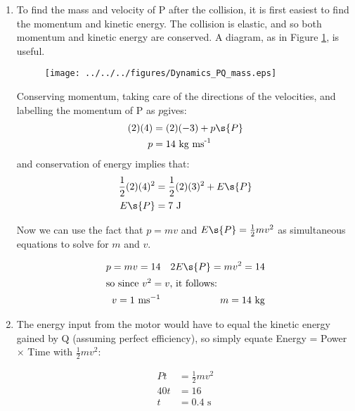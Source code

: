 \begin{problem}[AO1984PIQ1a]
{\begin{enumerate}
In order to work out the maximum tension; we need to relate the tension in the elastic to the extension: the force required to stretch the elastic is  where  is commonly called the spring constant, and so the tension, which is equal in magnitude but opposite in sign, must be . The constant $k$ can be found by considering the energy stored $E = \frac{1}{2}kx^{2}$ and we know both $E$ and $x$:
\begin{equation*} k = \frac{E}{x^{2}} = \frac{16}{(0.5)^{2}} \textrm{ N m}^{-1} = 128 \textrm{ N m}^{-1} \end{equation*}
and so the tension, which is maximum at the maximum extension, is:
\begin{equation*} T\s{max} = kx = (128)(0.5) \textrm{ N} = 64 \textrm{ N} \end{equation*}
	\item To find the mass and velocity of P after the collision, it is first easiest to find the momentum and kinetic energy. The collision is elastic, and so both momentum and kinetic energy are conserved. A diagram, as in Figure \ref{fig:Dynamics_PQ_mass}, is useful.
	
\begin{figure}[h]
	\centering
	\texttt{[image: ../../../figures/Dynamics\_PQ\_mass.eps]}
	\caption{}\label{fig:Dynamics_PQ_mass}
\end{figure}

Conserving momentum, taking care of the directions of the velocities, and labelling the momentum of P as $p$gives:
\begin{align*} 
(2)(4) &= (2)(-3) + p\s{P}  \\ 
p &= 14 \text{ kg ms}^{\text{-1}}
\end{align*}
and conservation of energy implies that:
\begin{align*} 
\frac{1}{2}(2)(4)^{2} &= \frac{1}{2}(2)(3)^{2} + E\s{P}  \\
 E\s{P} &= 7 \text{ J} 
 \end{align*}

Now we can use the fact that $p = mv$ and $E\s{P} = \frac{1}{2}mv^{2}$ as simultaneous equations to solve for $m$ and $v$.

\begin{align*} 
p = mv = 14 &&  2E\s{P} = mv^{2} = 14 \\ 
\intertext{so since $v^{2} = v$, it follows:} v = 1 \text{ ms}^{-1} && m = 14 \text{ kg} 
\end{align*}

	\item The energy input from the motor would have to equal the kinetic energy gained by Q (assuming perfect efficiency), so simply equate Energy = Power $\times$ Time with $\frac{1}{2}mv^{2}$:

\begin{align*} 
Pt &= \frac{1}{2}mv^{2} \\
 40t &= 16 \\ 
 t&=0.4\text{ s} 
 \end{align*}

\end{enumerate}
}
\end{problem}